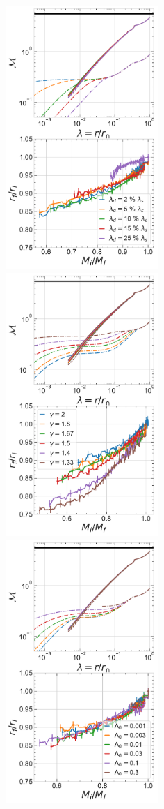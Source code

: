 \begin{figure}[htbp]
\centering
\includegraphics[height=10cm,trim={0 0cm 0.2cm 0},clip]{plots/relx_reln_shocked_vary-lamdish.pdf}
\includegraphics[height=10cm,trim={2.2cm 0 0.2cm 0},clip]{plots/relx_reln_shocked_vary-gam.pdf}
\includegraphics[height=10cm,trim={2.2cm 0 0.2cm 0},clip]{plots/relx_reln_shocked_vary-cooling.pdf}

\end{figure}
